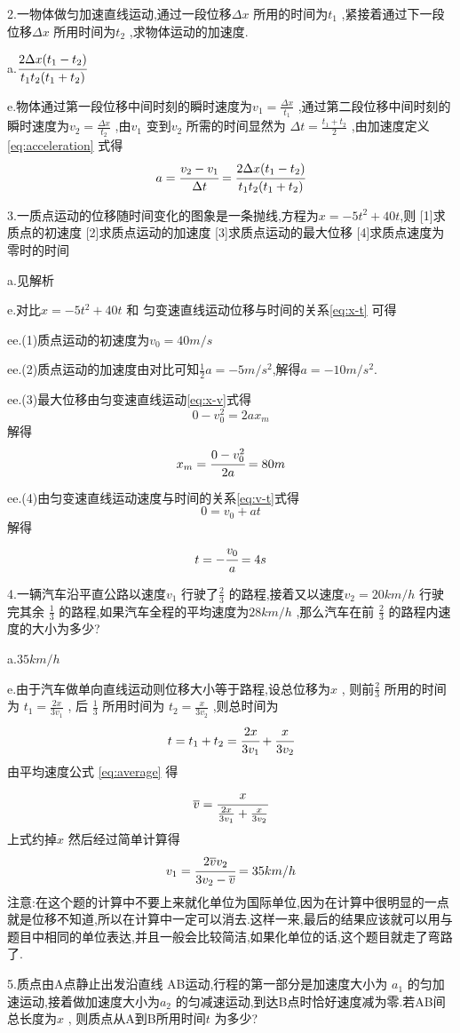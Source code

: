 \begin{calculate}
  2.一物体做匀加速直线运动,通过一段位移$\Delta x$ 所用的时间为$t_1$ ,紧接着通过下一段位移$\Delta x$ 所用时间为$t_2$ ,求物体运动的加速度.

  a.$\cfrac{2\Delta x(t_1-t_2)}{t_1t_2(t_1+t_2)}$

  e.物体通过第一段位移中间时刻的瞬时速度为$v_1=\frac{\Delta x}{t_1}$ ,通过第二段位移中间时刻的瞬时速度为$v_2=\frac{\Delta x}{t_2}$ ,由$v_1$ 变到$v_2$ 所需的时间显然为 $\Delta t=\frac{t_1+t_2}{2}$ ,由加速度定义\eqref{eq:acceleration} 式得
  $$a=\cfrac{v_2-v_1}{\Delta t}=\cfrac{2\Delta x(t_1-t_2)}{t_1t_2(t_1+t_2)}$$

  3.一质点运动的位移随时间变化的图象是一条抛线,方程为$x=-5t^2+40t$,则
  [1]求质点的初速度
  [2]求质点运动的加速度
  [3]求质点运动的最大位移
  [4]求质点速度为零时的时间

  a.见解析

  e.对比$x=-5t^2+40t$ 和 匀变速直线运动位移与时间的关系\eqref{eq:x-t} 可得

  ee.(1)质点运动的初速度为$v_0=40m/s$

  ee.(2)质点运动的加速度由对比可知$\frac{1}{2}a=-5m/s^2$,解得$a=-10m/s^2$.

  ee.(3)最大位移由匀变速直线运动\eqref{eq:x-v}式得
  $$0-v_0^2=2ax_m$$
  解得
  $$x_m=\cfrac{0-v_0^2}{2a}=80m$$
  
  ee.(4)由匀变速直线运动速度与时间的关系\eqref{eq:v-t}式得
  $$0=v_0+at$$
  解得
  $$t=-\cfrac{v_0}{a}=4s$$

  4.一辆汽车沿平直公路以速度$v_1$ 行驶了$\frac{2}{3}$ 的路程,接着又以速度$v_2=20km/h$ 行驶完其余 $\frac{1}{3}$ 的路程,如果汽车全程的平均速度为$28km/h$ ,那么汽车在前 $\frac{2}{3}$ 的路程内速度的大小为多少?

  a.$35km/h$

  e.由于汽车做单向直线运动则位移大小等于路程,设总位移为$x$ , 则前$\frac{2}{3}$ 所用的时间为 $t_1=\frac{2x}{3v_1}$ , 后 $\frac{1}{3}$ 所用时间为 $t_2=\frac{x}{3v_2} $ ,则总时间为 
  $$t=t_1+t_2=\cfrac{2x}{3v_1}+\cfrac{x}{3v_2}$$
  由平均速度公式 \eqref{eq:average} 得
  $$\overline{v}=\cfrac{x}{\frac{2x}{3v_1}+\frac{x}{3v_2}}$$
  上式约掉$x$ 然后经过简单计算得
  $$v_1=\cfrac{2\overline{v}v_2}{3v_2-\overline{v}}=35km/h$$
  注意:在这个题的计算中不要上来就化单位为国际单位,因为在计算中很明显的一点就是位移不知道,所以在计算中一定可以消去.这样一来,最后的结果应该就可以用与题目中相同的单位表达,并且一般会比较简洁,如果化单位的话,这个题目就走了弯路了.

  5.质点由A点静止出发沿直线 AB运动,行程的第一部分是加速度大小为 $a_1$ 的匀加速运动,接着做加速度大小为$a_2$ 的匀减速运动,到达B点时恰好速度减为零.若AB间总长度为$x$ , 则质点从A到B所用时间$t$ 为多少?


\end{calculate}
